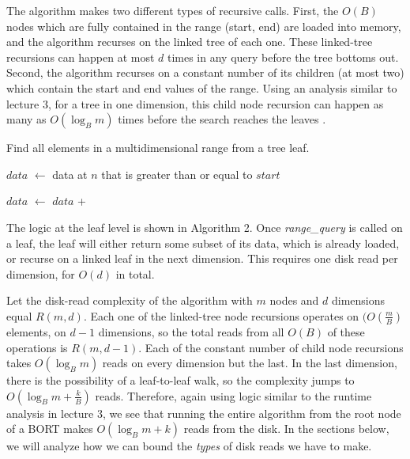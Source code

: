 \documentclass[11pt, oneside]{article}
\newcommand*\Let[2]{\State #1 $\gets$ #2}
\newcommand{\ms}{\textit}
\begin{document}
The algorithm makes two different types of recursive calls. First, the
$O(B)$ nodes which are fully contained in the range (start, end) are loaded into
memory, and the algorithm recurses on the linked tree of each one. These
linked-tree recursions can happen at most $d$ times in any query before the
tree bottoms out. Second, the algorithm recurses on a constant number of its
children (at most two) which contain the start and end values of the range.
Using an analysis similar to lecture 3, for a tree in one dimension, this
child node recursion can happen as many as $O(\log_B m)$ times before the search
reaches the leaves \cite{lecture}. 

\begin{algorithm}[H]
    \caption{Find all elements in a multidimensional range from a tree leaf.}
    \begin{algorithmic}[1]
            \Let{$data$}{data at $n$ that is greater than or equal to $start$}

            \Let{$data$}{$data$ + } 
            \EndIf

            \State {}
        \EndFunction
    \end{algorithmic}
\end{algorithm}

The logic at the leaf level is shown in Algorithm 2. Once \ms{range\_query} is
called on a leaf, the leaf will either return some subset of its data, which is
already loaded, or recurse on a linked leaf in the next dimension. This requires
one disk read per dimension, for $O(d)$ in total. 

Let the disk-read complexity of the algorithm with $m$ nodes and $d$ dimensions
equal $R(m, d)$. Each one of the linked-tree node recursions operates on
$(O(\frac{m}{B})$ elements, on $d-1$ dimensions, so the total reads from all $O(B)$
of these operations is $R(m, d-1)$. Each of the constant number of child node
recursions takes $O(\log_B m)$ reads on every dimension but the last. In the
last dimension, there is the possibility of a leaf-to-leaf walk, so the
complexity jumps to $O(\log_B m + \frac{k}{B})$ reads. Therefore, again using
logic similar to the runtime analysis in lecture 3, we see that running the
entire algorithm from the root node of a BORT makes $O(\log_B m + k)$ reads from
the disk. In the sections below, we will analyze how we can bound the
\textit{types} of disk reads we have to make.
\end{document}
